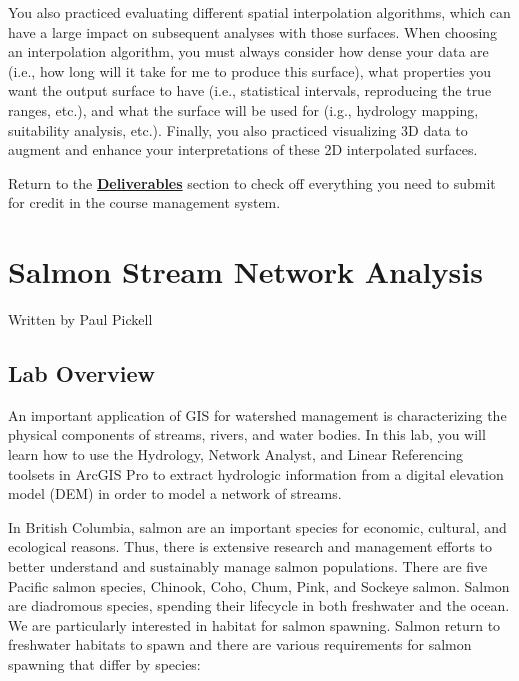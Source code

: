 \documentclass[
]{book}
\begin{document}
You also practiced evaluating different spatial interpolation algorithms, which can have a large impact on subsequent analyses with those surfaces. When choosing an interpolation algorithm, you must always consider how dense your data are (i.e., how long will it take for me to produce this surface), what properties you want the output surface to have (i.e., statistical intervals, reproducing the true ranges, etc.), and what the surface will be used for (i.g., hydrology mapping, suitability analysis, etc.). Finally, you also practiced visualizing 3D data to augment and enhance your interpretations of these 2D interpolated surfaces.

Return to the \protect\hyperlink{lab1-deliverables}{\textbf{Deliverables}} section to check off everything you need to submit for credit in the course management system.

\hypertarget{network-analysis}{%
\chapter{Salmon Stream Network Analysis}\label{network-analysis}}

Written by
Paul Pickell

\hypertarget{lab-overview-1}{%
\section*{Lab Overview}\label{lab-overview-1}}

An important application of GIS for watershed management is characterizing the physical components of streams, rivers, and water bodies. In this lab, you will learn how to use the Hydrology, Network Analyst, and Linear Referencing toolsets in ArcGIS Pro to extract hydrologic information from a digital elevation model (DEM) in order to model a network of streams.

In British Columbia, salmon are an important species for economic, cultural, and ecological reasons. Thus, there is extensive research and management efforts to better understand and sustainably manage salmon populations. There are five Pacific salmon species, Chinook, Coho, Chum, Pink, and Sockeye salmon. Salmon are diadromous species, spending their lifecycle in both freshwater and the ocean. We are particularly interested in habitat for salmon spawning. Salmon return to freshwater habitats to spawn and there are various requirements for salmon spawning that differ by species:
\end{document}
